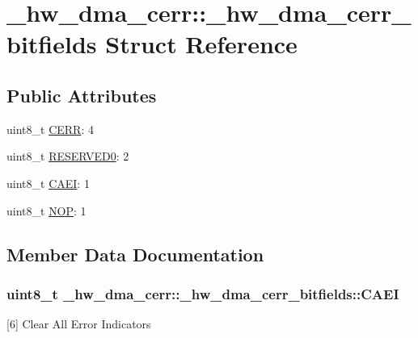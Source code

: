 \hypertarget{struct__hw__dma__cerr_1_1__hw__dma__cerr__bitfields}{}\section{\+\_\+hw\+\_\+dma\+\_\+cerr\+:\+:\+\_\+hw\+\_\+dma\+\_\+cerr\+\_\+bitfields Struct Reference}
\label{struct__hw__dma__cerr_1_1__hw__dma__cerr__bitfields}
\subsection*{Public Attributes}
\begin{DoxyCompactItemize}
\item 
uint8\+\_\+t \hyperlink{struct__hw__dma__cerr_1_1__hw__dma__cerr__bitfields_a68822305bb5a3108e9c42b22ad842c56}{C\+E\+RR}\+: 4
\item 
uint8\+\_\+t \hyperlink{struct__hw__dma__cerr_1_1__hw__dma__cerr__bitfields_a33f702a96a1b5431dafc4b8fa1eae5f3}{R\+E\+S\+E\+R\+V\+E\+D0}\+: 2
\item 
uint8\+\_\+t \hyperlink{struct__hw__dma__cerr_1_1__hw__dma__cerr__bitfields_ad19d7fdc6d6d5e047266d01d3cd40dba}{C\+A\+EI}\+: 1
\item 
uint8\+\_\+t \hyperlink{struct__hw__dma__cerr_1_1__hw__dma__cerr__bitfields_a91c0d1fa1d5a364fc439d1d6de68ae03}{N\+OP}\+: 1
\end{DoxyCompactItemize}


\subsection{Member Data Documentation}
\subsubsection[{\texorpdfstring{C\+A\+EI}{CAEI}}]{\setlength{\rightskip}{0pt plus 5cm}uint8\+\_\+t \+\_\+hw\+\_\+dma\+\_\+cerr\+::\+\_\+hw\+\_\+dma\+\_\+cerr\+\_\+bitfields\+::\+C\+A\+EI}\hypertarget{struct__hw__dma__cerr_1_1__hw__dma__cerr__bitfields_ad19d7fdc6d6d5e047266d01d3cd40dba}{}\label{struct__hw__dma__cerr_1_1__hw__dma__cerr__bitfields_ad19d7fdc6d6d5e047266d01d3cd40dba}
\mbox{[}6\mbox{]} Clear All Error Indicators 
